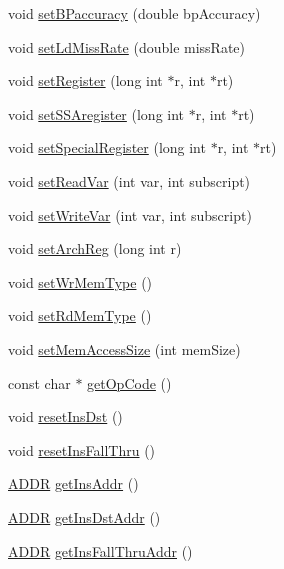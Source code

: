 \begin{DoxyCompactItemize}
\item 
void \hyperlink{classinstruction_a613fd5dcaabf9a68596545679b17ffd8}{setBPaccuracy} (double bpAccuracy)
\item 
void \hyperlink{classinstruction_a5052a04bf5db0d0e1519eb54f343bdc6}{setLdMissRate} (double missRate)
\item 
void \hyperlink{classinstruction_a456de8aa26ff79d2b7cd203f7c59f2cb}{setRegister} (long int $\ast$r, int $\ast$rt)
\item 
void \hyperlink{classinstruction_a3623f439924f86cba8f9e115e19e7514}{setSSAregister} (long int $\ast$r, int $\ast$rt)
\item 
void \hyperlink{classinstruction_ae171d8892a0c330d2fa475346e321724}{setSpecialRegister} (long int $\ast$r, int $\ast$rt)
\item 
void \hyperlink{classinstruction_a093ff19f17baaf84d4539ea395468265}{setReadVar} (int var, int subscript)
\item 
void \hyperlink{classinstruction_a67c584522eaa68d46a495170ce8a3bbd}{setWriteVar} (int var, int subscript)
\item 
void \hyperlink{classinstruction_a8e201444f39b8a779022284e280fdf23}{setArchReg} (long int r)
\item 
void \hyperlink{classinstruction_a1a85e010b731e20bcd25310a26eabd98}{setWrMemType} ()
\item 
void \hyperlink{classinstruction_a0d47af8822438b6e838c08dbd31cc02c}{setRdMemType} ()
\item 
void \hyperlink{classinstruction_ab36280a1a2cd3339e45c8271deaa23d0}{setMemAccessSize} (int memSize)
\item 
const char $\ast$ \hyperlink{classinstruction_a47d6ca18417d4f185495eb9be2844f07}{getOpCode} ()
\item 
void \hyperlink{classinstruction_aadbc60fe35dec68a1a8589cfc9fcc022}{resetInsDst} ()
\item 
void \hyperlink{classinstruction_ac796f0f05fa4011d7c05c2155020c5bb}{resetInsFallThru} ()
\item 
\hyperlink{binaryTranslator_2global_8h_a8bb6b77b3aab51e3a8d1866dd5861225}{ADDR} \hyperlink{classinstruction_ac1fabe854c85726785052c7a5ebf6d39}{getInsAddr} ()
\item 
\hyperlink{binaryTranslator_2global_8h_a8bb6b77b3aab51e3a8d1866dd5861225}{ADDR} \hyperlink{classinstruction_a600fd1454a34eca9a64057e3c019a795}{getInsDstAddr} ()
\item 
\hyperlink{binaryTranslator_2global_8h_a8bb6b77b3aab51e3a8d1866dd5861225}{ADDR} \hyperlink{classinstruction_a6b94ce0e75e6676de23c2a87a19eecd3}{getInsFallThruAddr} ()

\end{DoxyCompactItemize}
